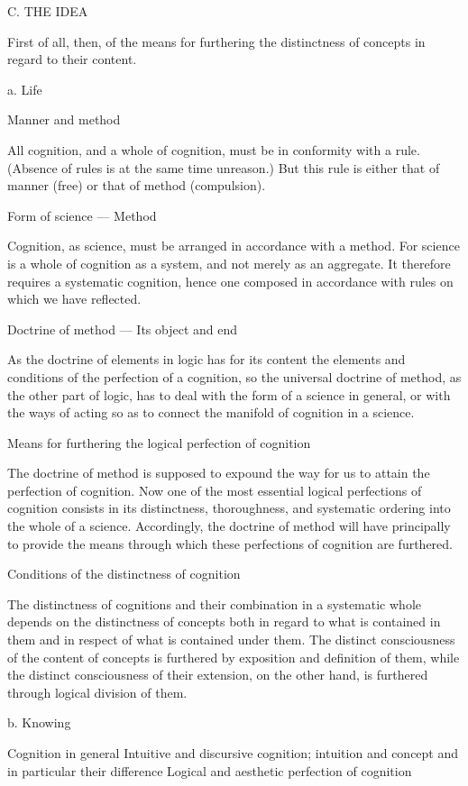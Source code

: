 C. THE IDEA

First of all, then, of the means for furthering
the distinctness of concepts in regard to their content.

a. Life

Manner and method

All cognition, and a whole of cognition,
must be in conformity with a rule.
(Absence of rules is at the same time unreason.)
But this rule is either that of manner (free)
or that of method (compulsion).

Form of science — Method

Cognition, as science, must be arranged
in accordance with a method.
For science is a whole of cognition as a system,
and not merely as an aggregate.
It therefore requires a systematic cognition,
hence one composed in accordance with rules
on which we have reflected.

Doctrine of method — Its object and end

As the doctrine of elements in logic has for its content
the elements and conditions of the perfection of a cognition,
so the universal doctrine of method, as the other part of logic,
has to deal with the form of a science in general,
or with the ways of acting so as to connect
the manifold of cognition in a science.

Means for furthering the logical perfection of cognition

The doctrine of method is supposed to expound the way for us
to attain the perfection of cognition.
Now one of the most essential logical perfections of cognition
consists in its distinctness, thoroughness, and systematic ordering
into the whole of a science.
Accordingly, the doctrine of method will have principally to provide
the means through which these perfections of cognition are furthered.

Conditions of the distinctness of cognition

The distinctness of cognitions and their combination
in a systematic whole depends on the distinctness of concepts
both in regard to what is contained in them
and in respect of what is contained under them.
The distinct consciousness of the content of concepts is furthered
by exposition and definition of them,
while the distinct consciousness of their extension, on the other hand,
is furthered through logical division of them.

b. Knowing

Cognition in general
    Intuitive and discursive cognition;
        intuition and concept
        and in particular their difference
    Logical and aesthetic perfection of cognition

